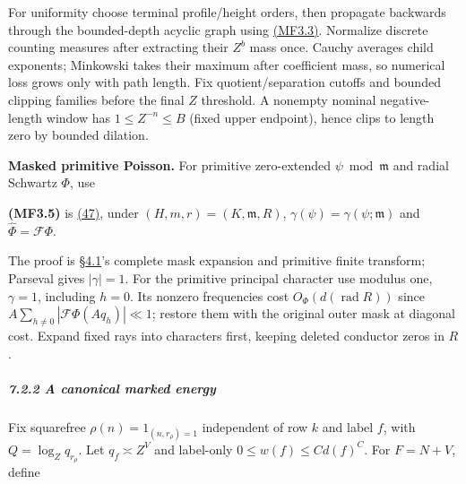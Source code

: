 For uniformity choose terminal profile/height orders, then propagate backwards through the bounded-depth acyclic graph using \protect\hyperlink{mf:eq:B3.3}{(MF3.3)}. Normalize discrete counting measures after extracting their \(Z^b\) mass once. Cauchy averages child exponents; Minkowski takes their maximum after coefficient mass, so numerical loss grows only with path length. Fix quotient/separation cutoffs and bounded clipping families before the final \(Z\) threshold. A nonempty nominal negative-length window has \(1\le Z^{-n}\le B\) (fixed upper endpoint), hence clips to length zero by bounded dilation.

\textbf{Masked primitive Poisson.} For primitive zero-extended \(\psi\bmod\mathfrak m\) and radial Schwartz \(\Phi\), use

\hypertarget{mf:eq:B3.5}{}

\label{mf:eq:B3.5}

\textbf{(MF3.5)} is \protect\hyperlink{cf:eq:C.3}{(47)}, under \((H,m,r)=(K,\mathfrak m,R)\), \(\gamma(\psi)=\gamma(\psi;\mathfrak m)\) and \(\widehat\Phi=\mathcal F\Phi\).

The proof is §\protect\hyperlink{cf:sec:C.1}{4.1}'s complete mask expansion and primitive finite transform; Parseval gives \(|\gamma|=1\). For the primitive principal character use modulus one, \(\gamma=1\), including \(h=0\). Its nonzero frequencies cost \(O_\Phi(d(\operatorname{rad}R))\) since \(A\sum_{h\ne0}|\mathcal F\Phi(Aq_h)|\ll1\); restore them with the original outer mask at diagonal cost. Expand fixed rays into characters first, keeping deleted conductor zeros in \(R\).

\hypertarget{a-canonical-marked-energy}{}

\label{a-canonical-marked-energy}

\hypertarget{a-canonical-marked-energy-heading-2}{%
\subparagraph{7.2.2 A canonical marked energy}}

Fix squarefree \(\rho(n)=1_{(n,r_\rho)=1}\) independent of row \(k\) and label \(f\), with \(Q=\log_Zq_{r_\rho}\). Let \(q_f\asymp Z^V\) and label-only \(0\le w(f)\le Cd(f)^C\). For \(F=N+V\), define

\hypertarget{mf:eq:B3.6}{}

\label{mf:eq:B3.6}

\par\noindent\resizebox{\linewidth}{!}{\begin{minipage}{\dimexpr\linewidth+19.25075pt\relax}\[
\mathcal E(N,V,M)=Z^{-V}\sum_f w(f)\sum_{0<q_k\ll Z^M}
 \left|Z^{-N/2}\sum_{n\ {\rm sf}}a_0(n)\nu(n)\rho(n)
       \chi_n(k)\chi_n(f)^4d_I(n)W(q_n/Z^N)\right|^2.
\qquad\text{(MF3.6)}
\]\end{minipage}}\par

